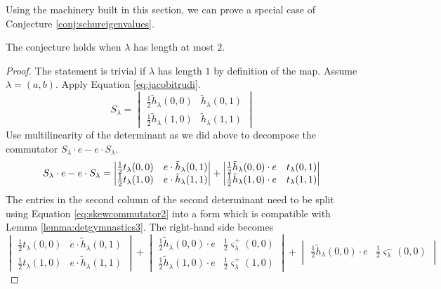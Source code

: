 Using the machinery built in this section, we can prove a special case of Conjecture \ref{conj:schureigenvalues}.

\begin{proposition}
The conjecture holds when $\lambda$ has length at most $2$.
\end{proposition}
\begin{proof}
The statement is trivial if $\lambda$ has length $1$ by definition of the map. Assume $\lambda = (a, b)$. Apply Equation \eqref{eq:jacobitrudi}.
\[
S_\lambda = 
\begin{vmatrix}
\frac{1}{2}\tilde{h}_\lambda(0,0) & \tilde{h}_\lambda(0,1) \\
\frac{1}{2}\tilde{h}_\lambda(1,0) & \tilde{h}_\lambda(1,1)
\end{vmatrix}
\]
Use multilinearity of the determinant as we did above to decompose the commutator $S_\lambda \cdot e - e \cdot S_\lambda$.
\begin{equation*}
S_\lambda \cdot e - e \cdot S_\lambda = 
\begin{vmatrix}
\frac{1}{2} t_\lambda(0,0) & e \cdot \tilde{h}_\lambda(0,1) \\
\frac{1}{2} t_\lambda(1,0) & e \cdot \tilde{h}_\lambda(1,1)
\end{vmatrix}
+
\begin{vmatrix}
\frac{1}{2}\tilde{h}_\lambda(0,0) \cdot e & t_\lambda(0,1) \\
\frac{1}{2}\tilde{h}_\lambda(1,0) \cdot e & t_\lambda(1,1)
\end{vmatrix} \\
\end{equation*}
The entries in the second column of the second determinant need to be split using Equation \eqref{eq:skewcommutator2} into a form which is compatible with Lemma \ref{lemma:detgymnastics3}. The right-hand side becomes
\[
\begin{vmatrix}
\frac{1}{2} t_\lambda(0,0) & e \cdot \tilde{h}_\lambda(0,1) \\
\frac{1}{2} t_\lambda(1,0) & e \cdot \tilde{h}_\lambda(1,1)
\end{vmatrix}
+
\begin{vmatrix}
\frac{1}{2}\tilde{h}_\lambda(0,0) \cdot e & \frac{1}{2} \varsigma_\lambda^+(0,0) \\
\frac{1}{2}\tilde{h}_\lambda(1,0) \cdot e & \frac{1}{2} \varsigma_\lambda^+(1,0)
\end{vmatrix}
+
\begin{vmatrix}
\frac{1}{2}\tilde{h}_\lambda(0,0) \cdot e & \frac{1}{2} \varsigma_\lambda^-(0,0) \\

\end{vmatrix}\]
\end{proof}
